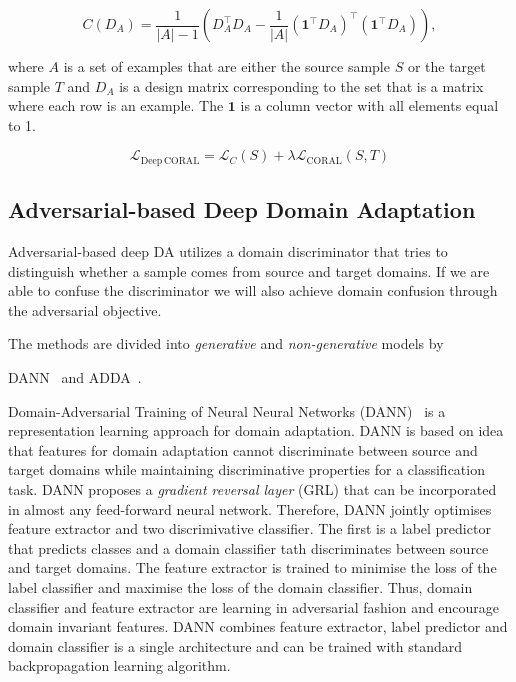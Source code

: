\begin{equation}
	C(D_A) = \frac{1}{|A| - 1} (D_A^\top D_A
	- \frac{1}{|A|} (\mathbf{1}^\top D_A)^\top (\mathbf{1}^\top D_A)),
\end{equation}

where \(A\) is a set of examples
that are either the source sample \(S\) or the target sample \(T\)
and \(D_A\) is a design matrix corresponding to the set
that is a matrix where each row is an example.
The \(\mathbf{1}\) is a column vector with all elements equal to 1.

\begin{equation}
	\mathcal{L}_{\mathrm{Deep\,CORAL}}
	= \mathcal{L}_C(S) + \lambda \mathcal{L}_{\mathrm{CORAL}}(S, T)
\end{equation}

\subsection{Adversarial-based Deep Domain Adaptation}

Adversarial-based deep DA utilizes a domain discriminator
that tries to distinguish whether a sample comes from source and target domains.
If we are able to confuse the discriminator
we will also achieve domain confusion through the adversarial objective.

The methods are divided into \textit{generative} and \textit{non-generative}
models by~\cite{wang2018}

DANN~\cite{ganin2016} and ADDA~\cite{tzeng2017}.

Domain-Adversarial Training of Neural Neural Networks (DANN)~\cite{ganin2016}
is a representation learning approach for domain adaptation.
DANN is based on idea that features for domain adaptation
cannot discriminate between source and target domains
while maintaining discriminative properties for a classification task.
DANN proposes a \textit{gradient reversal layer} (GRL)
that can be incorporated in almost any feed-forward neural network.
Therefore, DANN jointly optimises feature extractor
and two discrimivative classifier.
The first is a label predictor that predicts classes
and a domain classifier tath discriminates between source and target domains.
The feature extractor is trained to minimise the loss of the label classifier
and maximise the loss of the domain classifier.
Thus, domain classifier and feature extractor are learning in adversarial fashion and encourage domain invariant features.
DANN combines feature extractor, label predictor and domain classifier is a single architecture
and can be trained with standard backpropagation learning algorithm.

